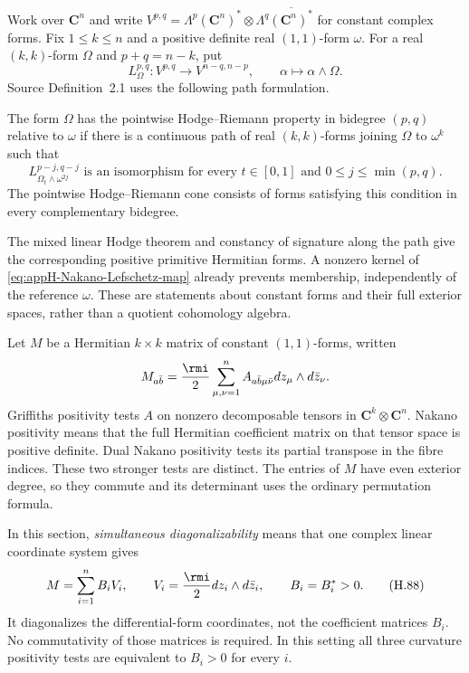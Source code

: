 Work over $\mathbf C^n$ and write
$V^{p,q}=\Lambda^p(\mathbf C^n)^*\otimes
\Lambda^q\overline{(\mathbf C^n)^*}$ for constant complex forms.
Fix $1\leq k\leq n$ and a positive definite real $(1,1)$-form
$\omega$. For a real $(k,k)$-form $\Omega$ and $p+q=n-k$, put
\begin{equation*}
 L^{p,q}_{\Omega}:V^{p,q}\longrightarrow V^{n-q,n-p},
 \qquad \alpha\longmapsto\alpha\wedge\Omega.
 \tag{H.87}\label{eq:appH-Nakano-Lefschetz-map}
\end{equation*}
Source Definition~2.1 uses the following path formulation.

\begin{definition}
\label{def:appH-Nakano-HR-path}
The form $\Omega$ has the pointwise Hodge--Riemann property
in bidegree $(p,q)$ relative to $\omega$ if there is a continuous
path of real $(k,k)$-forms joining $\Omega$ to $\omega^k$ such that
\[
 L^{p-j,q-j}_{\Omega_t\wedge\omega^{2j}}
 \text{ is an isomorphism for every }t\in[0,1]
 \text{ and }0\leq j\leq\min(p,q).
\]
The pointwise Hodge--Riemann cone consists of forms satisfying
this condition in every complementary bidegree.
\end{definition}

The mixed linear Hodge theorem and constancy of signature along
the path give the corresponding positive primitive Hermitian
forms. A nonzero kernel of \eqref{eq:appH-Nakano-Lefschetz-map}
already prevents membership, independently of the reference
$\omega$. These are statements about constant forms and their
full exterior spaces, rather than a quotient cohomology algebra.

Let $M$ be a Hermitian $k\times k$ matrix of constant $(1,1)$-forms,
written
\[
 M_{a\bar b}=\frac{\rmi}{2}
       \sum_{\mu,\nu=1}^n A_{a\bar b\mu\bar\nu}
                dz_\mu\wedge d\bar z_\nu.
\]
Griffiths positivity tests $A$ on nonzero decomposable tensors
in $\mathbf C^k\otimes\mathbf C^n$. Nakano positivity means that
the full Hermitian coefficient matrix on that tensor space is
positive definite. Dual Nakano positivity tests its partial
transpose in the fibre indices. These two stronger tests are
distinct. The entries of $M$ have even exterior degree, so they
commute and its determinant uses the ordinary permutation formula.

In this section, \emph{simultaneous diagonalizability} means that
one complex linear coordinate system gives
\begin{equation*}
 M=\sum_{i=1}^n B_iV_i,\qquad
 V_i=\frac{\rmi}{2}dz_i\wedge d\bar z_i,\qquad B_i=B_i^*>0.
 \tag{H.88}\label{eq:appH-Nakano-SD}
\end{equation*}
It diagonalizes the differential-form coordinates, not the
coefficient matrices $B_i$. No commutativity of those matrices
is required. In this setting all three curvature positivity
tests are equivalent to $B_i>0$ for every $i$.

